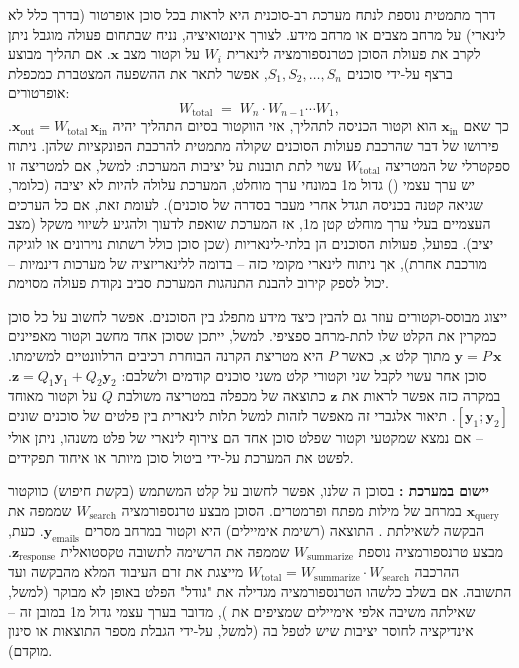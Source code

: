 
דרך מתמטית נוספת לנתח מערכת רב-סוכנית היא לראות בכל סוכן אופרטור (בדרך כלל לא לינארי) על מרחב מצבים או מרחב מידע. לצורך אינטואיציה, נניח שבתחום פעולה מוגבל ניתן לקרב את פעולת הסוכן כטרנספורמציה לינארית $W_i$ על וקטור מצב $\mathbf{x}$. אם תהליך מבוצע ברצף על-ידי סוכנים $S_1, S_2, \dots, S_n$, אפשר לתאר את ההשפעה המצטברת כמכפלת אופרטורים:
\[
W_{\text{total}} \;=\; W_n \cdot W_{n-1} \cdots W_1,
\]
כך שאם $\mathbf{x}_{\text{in}}$ הוא וקטור הכניסה לתהליך, אזי הווקטור בסיום התהליך יהיה $\mathbf{x}_{\text{out}} = W_{\text{total}}\, \mathbf{x}_{\text{in}}$. פירושו של דבר שהרכבת פעולות הסוכנים שקולה מתמטית להרכבת הפונקציות שלהן. ניתוח ספקטרלי של המטריצה $W_{\text{total}}$ עשוי לתת תובנות על יציבות המערכת: למשל, אם למטריצה זו יש ערך עצמי () גדול מ\en{-}\num{1} במונחי ערך מוחלט, המערכת עלולה להיות לא יציבה (כלומר, שגיאה קטנה בכניסה תגדל אחרי מעבר בסדרה של סוכנים). לעומת זאת, אם כל הערכים העצמיים בעלי ערך מוחלט קטן מ\en{-}\num{1}, אז המערכת שואפת לדעוך ולהגיע לשיווי משקל (מצב יציב). בפועל, פעולות הסוכנים הן בלתי-לינאריות (שכן סוכן  כולל רשתות נוירונים או לוגיקה מורכבת אחרת), אך ניתוח לינארי מקומי כזה – בדומה ללינאריזציה של מערכות דינמיות – יכול לספק קירוב להבנת התנהגות המערכת סביב נקודת פעולה מסוימת.

ייצוג מבוסס-וקטורים עוזר גם להבין כיצד מידע מתפלג בין הסוכנים. אפשר לחשוב על כל סוכן כמקרין את הקלט שלו לתת-מרחב ספציפי. למשל, ייתכן שסוכן אחד מחשב וקטור מאפיינים $\mathbf{y} = P\,\mathbf{x}$ מתוך קלט $\mathbf{x}$, כאשר $P$ היא מטריצת הקרנה הבוחרת רכיבים הרלוונטיים למשימתו. סוכן אחר עשוי לקבל שני וקטורי קלט משני סוכנים קודמים ולשלבם: $\mathbf{z} = Q_1 \mathbf{y}_1 + Q_2 \mathbf{y}_2$. במקרה כזה אפשר לראות את $\mathbf{z}$ כתוצאה של מכפלה במטריצה משולבת $Q$ על וקטור מאוחד $[\mathbf{y}_1;\mathbf{y}_2]$. תיאור אלגברי זה מאפשר לזהות למשל תלות לינארית בין פלטים של סוכנים שונים – אם נמצא שמקטעי וקטור שפלט סוכן אחד הם צירוף לינארי של פלט משנהו, ניתן אולי לפשט את המערכת על-ידי ביטול סוכן מיותר או איחוד תפקידים.

\textbf{יישום במערכת :} בסוכן ה שלנו, אפשר לחשוב על קלט המשתמש (בקשת חיפוש) כווקטור $\mathbf{x}_{\text{query}}$ במרחב של מילות מפתח ופרמטרים. הסוכן מבצע טרנספורמציה $W_{\text{search}}$ שממפה את הבקשה לשאילתת . התוצאה (רשימת אימיילים) היא וקטור במרחב מסרים $\mathbf{y}_{\text{emails}}$. כעת,  מבצע טרנספורמציה נוספת $W_{\text{summarize}}$ שממפה את הרשימה לתשובה טקסטואלית $\mathbf{z}_{\text{response}}$. ההרכבה $W_{\text{total}} = W_{\text{summarize}} \cdot W_{\text{search}}$ מייצגת את זרם העיבוד המלא מהבקשה ועד התשובה. אם בשלב כלשהו הטרנספורמציה מגדילה את "גודל" הפלט באופן לא מבוקר (למשל, שאילתה משיבה אלפי אימיילים שמציפים את ), מדובר בערך עצמי גדול מ\en{-}\num{1} במובן זה – אינדיקציה לחוסר יציבות שיש לטפל בה (למשל, על-ידי הגבלת מספר התוצאות או סינון מוקדם).

